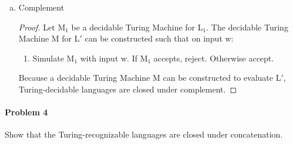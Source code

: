 ﻿\documentclass{article}
\begin{document}
\begin{enumerate}[a)]
\begin{enumerate}[a)]
\begin{proof}
Let M$_{1}$ be a decidable Turing Machine for L$_{1}$ and M$_{2}$ be a decidable Turing Machine for L$_{2}$. The decidable Turing Machine M for L$_{1} \cap$ L$_{2}$ can be constructed such that on input w:

\begin{enumerate} [1.]
\item Simulate M$_{1}$ with input w. If M$_{1}$ accepts, go to Step 2. Otherwise reject.
\item Simulate M$_{2}$ with input w. If M$_{1}$ rejects, reject. Otherwise accept.
\end{enumerate}

Because a decidable Turing Machine M can be constructed to evaluate L$_{1} \cap$ L$_{2}$, Turing-decidable languages are closed under intersection.

\end{proof}

\item Complement

\begin{proof}

Let M$_{1}$ be a decidable Turing Machine for L$_{1}$. The decidable Turing Machine M for L$'$ can be constructed such that on input w:

\begin{enumerate} [1.]
\item Simulate M$_{1}$ with input w. If M$_{1}$ accepts, reject. Otherwise accept.
\end{enumerate}

Because a decidable Turing Machine M can be constructed to evaluate L$'$, Turing-decidable languages are closed under complement.

\end{proof}

\end{enumerate}


\paragraph{Problem 4} Show that the Turing-recognizable languages are closed under concatenation.

\end{enumerate}
\end{document}
